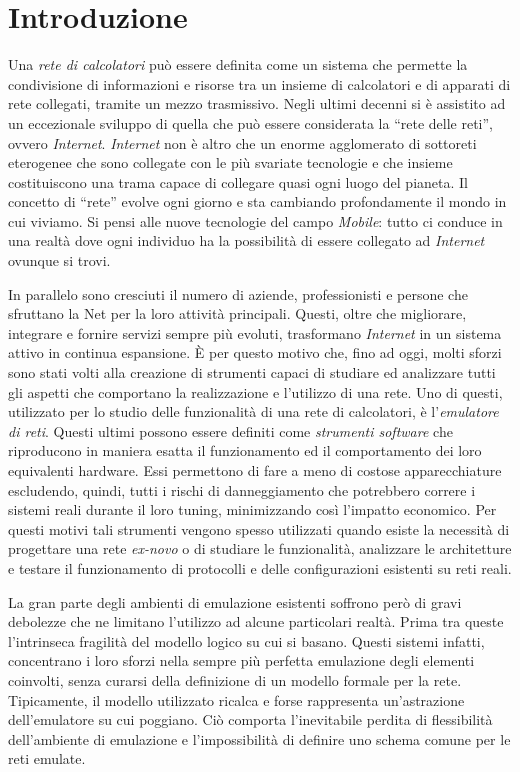 \chapter*{Introduzione}

Una \emph{rete di calcolatori} può essere definita come un sistema che permette la condivisione di informazioni e risorse tra un insieme di calcolatori e di apparati di rete collegati, tramite un mezzo trasmissivo.
Negli ultimi decenni si è assistito ad un eccezionale sviluppo di quella che può essere considerata la ``rete delle reti'', ovvero \emph{Internet}.
\emph{Internet} non è altro che un enorme agglomerato di sottoreti eterogenee che sono collegate con le più svariate tecnologie e che insieme costituiscono una trama capace di collegare quasi ogni luogo del pianeta. Il concetto di ``rete'' evolve ogni giorno e sta cambiando profondamente il mondo in cui viviamo. Si pensi alle nuove tecnologie del campo \emph{Mobile}: tutto ci conduce in una realtà dove ogni individuo ha la possibilità di essere collegato ad \emph{Internet} ovunque si trovi.

In parallelo sono cresciuti il numero di aziende, professionisti e persone che sfruttano la Net per la loro attività principali. Questi, oltre che migliorare, integrare e fornire servizi sempre più evoluti, trasformano \emph{Internet} in un sistema attivo in continua espansione.
È per questo motivo che, fino ad oggi, molti sforzi sono stati volti alla creazione di strumenti capaci di studiare ed analizzare tutti gli aspetti che comportano la realizzazione e l'utilizzo di una rete.
Uno di questi, utilizzato per lo studio delle funzionalità di una rete di calcolatori, è l'\emph{emulatore di reti}. Questi ultimi possono essere definiti come \emph{strumenti software} che riproducono in maniera esatta il funzionamento ed il comportamento dei loro equivalenti hardware. Essi permettono di fare a meno di costose apparecchiature escludendo, quindi, tutti i rischi di danneggiamento che potrebbero correre i sistemi reali durante il loro tuning, minimizzando così l'impatto economico.
Per questi motivi tali strumenti vengono spesso utilizzati quando esiste la necessità di progettare una rete \emph{ex-novo} o di studiare le funzionalità, analizzare le architetture e testare il funzionamento di protocolli e delle configurazioni esistenti su reti reali.

La gran parte degli ambienti di emulazione esistenti soffrono però di gravi debolezze che ne limitano l'utilizzo ad alcune particolari realtà. Prima tra queste l'intrinseca fragilità del modello logico su cui si basano.
Questi sistemi infatti, concentrano i loro sforzi nella sempre più perfetta emulazione degli elementi coinvolti, senza curarsi della definizione di un modello formale per la rete.
Tipicamente, il modello utilizzato ricalca e forse rappresenta un'astrazione dell'emulatore su cui poggiano. Ciò comporta l'inevitabile perdita di flessibilità dell'ambiente di emulazione e l'impossibilità di definire uno schema comune per le reti emulate.

